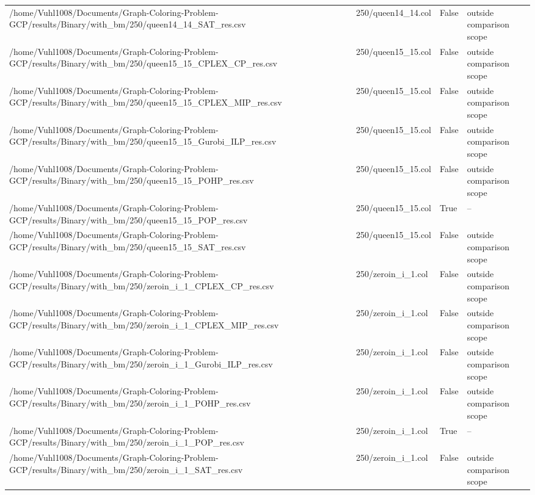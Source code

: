 \begin{table}[htbp]
\begin{tabular}{llll}
/home/Vuhl1008/Documents/Graph-Coloring-Problem-GCP/results/Binary/with\_bm/250/queen14\_14\_SAT\_res.csv & 250/queen14\_14.col & False & outside comparison scope \\
/home/Vuhl1008/Documents/Graph-Coloring-Problem-GCP/results/Binary/with\_bm/250/queen15\_15\_CPLEX\_CP\_res.csv & 250/queen15\_15.col & False & outside comparison scope \\
/home/Vuhl1008/Documents/Graph-Coloring-Problem-GCP/results/Binary/with\_bm/250/queen15\_15\_CPLEX\_MIP\_res.csv & 250/queen15\_15.col & False & outside comparison scope \\
/home/Vuhl1008/Documents/Graph-Coloring-Problem-GCP/results/Binary/with\_bm/250/queen15\_15\_Gurobi\_ILP\_res.csv & 250/queen15\_15.col & False & outside comparison scope \\
/home/Vuhl1008/Documents/Graph-Coloring-Problem-GCP/results/Binary/with\_bm/250/queen15\_15\_POHP\_res.csv & 250/queen15\_15.col & False & outside comparison scope \\
/home/Vuhl1008/Documents/Graph-Coloring-Problem-GCP/results/Binary/with\_bm/250/queen15\_15\_POP\_res.csv & 250/queen15\_15.col & True & -- \\
/home/Vuhl1008/Documents/Graph-Coloring-Problem-GCP/results/Binary/with\_bm/250/queen15\_15\_SAT\_res.csv & 250/queen15\_15.col & False & outside comparison scope \\
/home/Vuhl1008/Documents/Graph-Coloring-Problem-GCP/results/Binary/with\_bm/250/zeroin\_i\_1\_CPLEX\_CP\_res.csv & 250/zeroin\_i\_1.col & False & outside comparison scope \\
/home/Vuhl1008/Documents/Graph-Coloring-Problem-GCP/results/Binary/with\_bm/250/zeroin\_i\_1\_CPLEX\_MIP\_res.csv & 250/zeroin\_i\_1.col & False & outside comparison scope \\
/home/Vuhl1008/Documents/Graph-Coloring-Problem-GCP/results/Binary/with\_bm/250/zeroin\_i\_1\_Gurobi\_ILP\_res.csv & 250/zeroin\_i\_1.col & False & outside comparison scope \\
/home/Vuhl1008/Documents/Graph-Coloring-Problem-GCP/results/Binary/with\_bm/250/zeroin\_i\_1\_POHP\_res.csv & 250/zeroin\_i\_1.col & False & outside comparison scope \\
/home/Vuhl1008/Documents/Graph-Coloring-Problem-GCP/results/Binary/with\_bm/250/zeroin\_i\_1\_POP\_res.csv & 250/zeroin\_i\_1.col & True & -- \\
/home/Vuhl1008/Documents/Graph-Coloring-Problem-GCP/results/Binary/with\_bm/250/zeroin\_i\_1\_SAT\_res.csv & 250/zeroin\_i\_1.col & False & outside comparison scope \\

\end{tabular}
\end{table}
